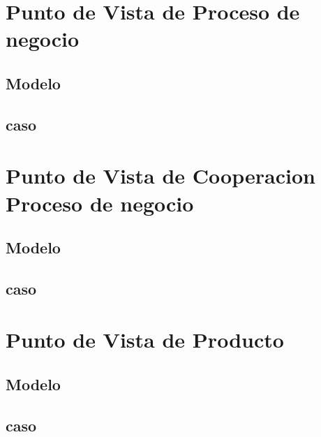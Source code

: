 \newpage

\section{Punto de Vista de Proceso de negocio}

\subsection{Modelo}

\newpage

\subsection{caso}

\newpage

\section{Punto de Vista de Cooperacion Proceso de negocio}

\subsection{Modelo}

\newpage

\subsection{caso}

\newpage

\section{Punto de Vista de Producto}

\subsection{Modelo}

\newpage

\subsection{caso}

\newpage

